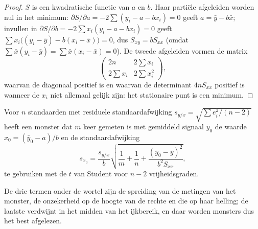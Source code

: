 \begin{proof}
$S$ is een kwadratische functie van $a$ en $b$. Haar partiële afgeleiden worden nul in het minimum:
$\partial S/\partial a = -2\sum(y_i - a - bx_i) = 0$ geeft $a = \bar y - b\bar x$; invullen in
$\partial S/\partial b = -2\sum x_i(y_i - a - bx_i) = 0$ geeft $\sum x_i\bigl((y_i - \bar y) - b(x_i -
\bar x)\bigr) = 0$, dus $S_{xy} = bS_{xx}$ (omdat $\sum \bar x(y_i - \bar y) = \sum \bar x(x_i - \bar
x) = 0$). De tweede afgeleiden vormen de matrix
\[\begin{pmatrix} 2n & 2\sum x_i\\ 2\sum x_i & 2\sum x_i^2\end{pmatrix},\]
waarvan de diagonaal positief is en waarvan de determinant $4nS_{xx}$ positief is wanneer de $x_i$ niet allemaal
gelijk zijn: het stationaire punt is een minimum.
\end{proof}

\begin{proposition}\label{prop:b2:measurement-statistics:interpolation}
Voor $n$ standaarden met residuele standaardafwijking $s_{y/x} = \sqrt{\sum e_i^2/(n-2)}$ heeft een monster dat
$m$ keer gemeten is met gemiddeld signaal $\bar y_0$ de waarde $x_0 = (\bar y_0 - a)/b$ en de standaardafwijking
\begin{equation*}
s_{x_0} = \frac{s_{y/x}}{b}\sqrt{\frac1m + \frac1n + \frac{(\bar y_0 - \bar y)^2}{b^2S_{xx}}},
\end{equation*}
te gebruiken met de $t$ van Student voor $n - 2$ vrijheidsgraden.
\end{proposition}

\admitted

De drie termen onder de wortel zijn de spreiding van de metingen van het monster, de onzekerheid op de hoogte
van de rechte en die op haar helling; de laatste verdwijnt in het midden van het ijkbereik, en daar
worden monsters dus het best afgelezen.

